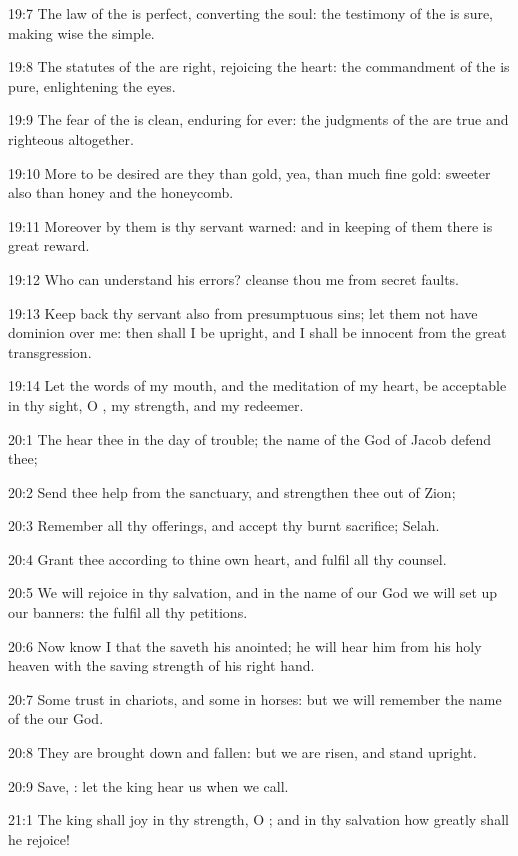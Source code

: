 19:7 The law of the \LORD is perfect, converting the soul: the testimony of the \LORD is sure, making wise the simple.

19:8 The statutes of the \LORD are right, rejoicing the heart: the commandment of the \LORD is pure, enlightening the eyes.

19:9 The fear of the \LORD is clean, enduring for ever: the judgments of the \LORD are true and righteous altogether.

19:10 More to be desired are they than gold, yea, than much fine gold: sweeter also than honey and the honeycomb.

19:11 Moreover by them is thy servant warned: and in keeping of them there is great reward.

19:12 Who can understand his errors? cleanse thou me from secret faults.

19:13 Keep back thy servant also from presumptuous sins; let them not have dominion over me: then shall I be upright, and I shall be innocent from the great transgression.

19:14 Let the words of my mouth, and the meditation of my heart, be acceptable in thy sight, O \LORD, my strength, and my redeemer.



20:1 The \LORD hear thee in the day of trouble; the name of the God of Jacob defend thee;

20:2 Send thee help from the sanctuary, and strengthen thee out of Zion;

20:3 Remember all thy offerings, and accept thy burnt sacrifice; Selah.

20:4 Grant thee according to thine own heart, and fulfil all thy counsel.

20:5 We will rejoice in thy salvation, and in the name of our God we will set up our banners: the \LORD fulfil all thy petitions.

20:6 Now know I that the \LORD saveth his anointed; he will hear him from his holy heaven with the saving strength of his right hand.

20:7 Some trust in chariots, and some in horses: but we will remember the name of the \LORD our God.

20:8 They are brought down and fallen: but we are risen, and stand upright.

20:9 Save, \LORD: let the king hear us when we call.



21:1 The king shall joy in thy strength, O \LORD; and in thy salvation how greatly shall he rejoice!

